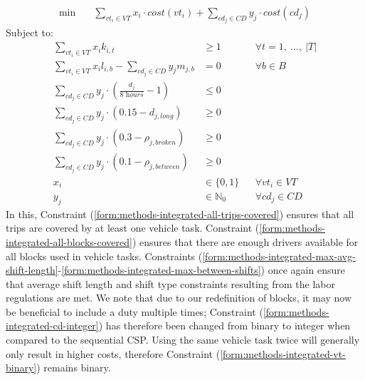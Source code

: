 \documentclass[]{article}
\begin{document}
\begin{align}
\min \quad
& \sum_{vt_i \in VT} x_{i} \cdot cost(vt_i) + \sum_{cd_j \in CD} y_{j} \cdot cost(cd_j)  
\end{align}
Subject to:
\begin{align}
\sum_{vt_i \in VT} x_{i}k_{i,t} &\geq 1 && \forall t = 1,\:\dots,\:|T| \label{form:methods-integrated-all-trips-covered} \\
\sum_{vt_i \in VT}x_i l_{i,b} - \sum_{cd_j \in CD}y_j m_{j,b} &= 0 && \forall b \in B \label{form:methods-integrated-all-blocks-covered} \\
\sum_{cd_j \in \textit{CD}} y_{j} \cdot (\frac{d_{j}}{\textit{8 hours}} - 1) &\leq 0 && \label{form:methods-integrated-max-avg-shift-length}\\
\sum_{cd_j \in \textit{CD}} y_{j} \cdot (0.15 - d_{j,\textit{long}}) &\geq 0 && \label{form:methods-integrated-max-long-shifts}\\
\sum_{cd_j \in \textit{CD}} y_{j} \cdot (0.3 - \rho_{j,\textit{broken}}) &\geq 0 && \label{form:methods-integrated-max-broken-shifts}\\
\sum_{cd_j \in \textit{CD}} y_{j} \cdot (0.1 - \rho_{j,\textit{between}}) &\geq 0 && \label{form:methods-integrated-max-between-shifts}\\
x_{i} &\in \{ 0, 1 \} && \forall vt_i \in VT \label{form:methods-integrated-vt-binary} \\
y_{j} &\in \mathbb{N}_0 && \forall cd_j \in CD \label{form:methods-integrated-cd-integer}
\end{align}
In this, Constraint (\ref{form:methods-integrated-all-trips-covered}) ensures that all trips are covered by at least one vehicle task. Constraint (\ref{form:methods-integrated-all-blocks-covered}) ensures that there are enough drivers available for all blocks used in vehicle tasks. Constraints (\ref{form:methods-integrated-max-avg-shift-length}-\ref{form:methods-integrated-max-between-shifts}) once again ensure that average shift length and shift type constraints resulting from the labor regulations are met. We note that due to our redefinition of blocks, it may now be beneficial to include a duty multiple times; Constraint (\ref{form:methods-integrated-cd-integer}) has therefore been changed from binary to integer when compared to the sequential CSP. Using the same vehicle task twice will generally only result in higher costs, therefore Constraint (\ref{form:methods-integrated-vt-binary}) remains binary. 
\end{document}
